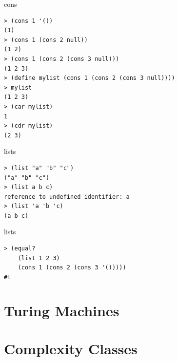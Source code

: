 \begin{frame}[fragile]{cons}
\begin{verbatim}
> (cons 1 '())
(1)
> (cons 1 (cons 2 null))
(1 2)
> (cons 1 (cons 2 (cons 3 null)))
(1 2 3)
> (define mylist (cons 1 (cons 2 (cons 3 null))))
> mylist
(1 2 3)
> (car mylist)
1
> (cdr mylist)
(2 3)
\end{verbatim}
\end{frame}

\begin{frame}[fragile]{lists}
\begin{verbatim}
> (list "a" "b" "c")
("a" "b" "c")
> (list a b c)
reference to undefined identifier: a
> (list 'a 'b 'c)
(a b c)
\end{verbatim}
\end{frame}

\begin{frame}[fragile]{lists}
\begin{verbatim}
> (equal? 
    (list 1 2 3)
    (cons 1 (cons 2 (cons 3 '()))))
#t
\end{verbatim}
\end{frame}

\section{Turing Machines}

\section{Complexity Classes}
